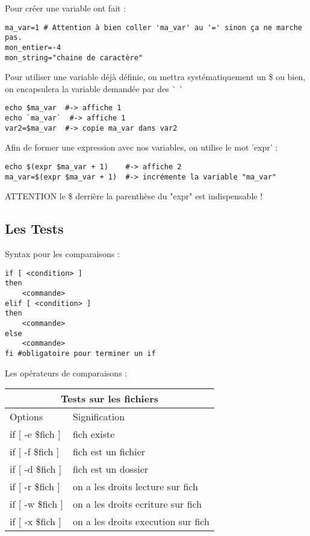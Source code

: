 \documentclass{article}
\begin{document}
Pour créer une variable ont fait :

\begin{verbatim}
ma_var=1 # Attention à bien coller 'ma_var' au '=' sinon ça ne marche pas.
mon_entier=-4
mon_string="chaine de caractère"
\end{verbatim}

Pour utiliser une variable déjà définie, on mettra systématiquement un \$ ou bien, on encapsulera la variable demandée par des \`{} \`{}

\begin{verbatim}
echo $ma_var  #-> affiche 1
echo `ma_var`  #-> affiche 1
var2=$ma_var  #-> copie ma_var dans var2
\end{verbatim}

Afin de former une expression avec nos variables, on utilise le mot 'expr' :

\begin{verbatim}
echo $(expr $ma_var + 1)    #-> affiche 2
ma_var=$(expr $ma_var + 1)  #-> incrémente la variable "ma_var"
\end{verbatim}

ATTENTION le \$ derrière la parenthèse du "expr" est indispensable !

\subsection{Les Tests}

Syntax pour les comparaisons :

\begin{verbatim}
if [ <condition> ]
then
    <commande>
elif [ <condition> ]
then
    <commande>
else
    <commande>
fi #obligatoire pour terminer un if
\end{verbatim}

Les opérateurs de comparaisons :

\begin{tabular}{ |p{4cm}||p{4cm}| }
 \hline
 \multicolumn{2}{|c|}{Tests sur les fichiers} \\
 \hline
  Options & Signification \\
 \hline
  if [ -e \$fich ] & fich existe\\
  if [ -f \$fich ] & fich est un fichier\\
  if [ -d \$fich ] & fich est un dossier\\
  if [ -r \$fich ] & on a les droits lecture sur fich\\
  if [ -w \$fich ] & on a les droits ecriture sur fich\\
  if [ -x \$fich ] & on a les droits execution sur fich\\
 \hline
\end{tabular}
\end{document}
